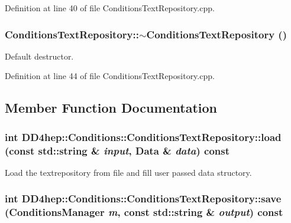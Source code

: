 Definition at line 40 of file ConditionsTextRepository.cpp.\hypertarget{class_d_d4hep_1_1_conditions_1_1_conditions_text_repository_af70e49d05e4819f28d4516fab871bd69}{
\subsubsection[{$\sim$ConditionsTextRepository}]{\setlength{\rightskip}{0pt plus 5cm}ConditionsTextRepository::$\sim$ConditionsTextRepository ()}}
\label{class_d_d4hep_1_1_conditions_1_1_conditions_text_repository_af70e49d05e4819f28d4516fab871bd69}


Default destructor. 

Definition at line 44 of file ConditionsTextRepository.cpp.

\subsection{Member Function Documentation}
\hypertarget{class_d_d4hep_1_1_conditions_1_1_conditions_text_repository_af8b9dd41da9a9d1598e471fe164ccd04}{
\subsubsection[{load}]{\setlength{\rightskip}{0pt plus 5cm}int DD4hep::Conditions::ConditionsTextRepository::load (const std::string \& {\em input}, \/  {\bf Data} \& {\em data}) const}}
\label{class_d_d4hep_1_1_conditions_1_1_conditions_text_repository_af8b9dd41da9a9d1598e471fe164ccd04}


Load the textrepository from file and fill user passed data structory. \hypertarget{class_d_d4hep_1_1_conditions_1_1_conditions_text_repository_abcba5f6f77c255256bbc25642e269eb4}{
\subsubsection[{save}]{\setlength{\rightskip}{0pt plus 5cm}int DD4hep::Conditions::ConditionsTextRepository::save ({\bf ConditionsManager} {\em m}, \/  const std::string \& {\em output}) const}}
\label{class_d_d4hep_1_1_conditions_1_1_conditions_text_repository_abcba5f6f77c255256bbc25642e269eb4}


